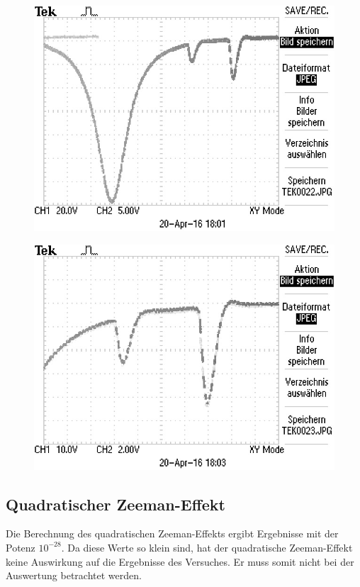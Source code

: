 \begin{figure}[H]
 \centering
 \includegraphics[width=12cm]{TEK0022.jpg}
 \caption{}
 \label{abb:oszi1}
\end{figure}


\begin{figure}[H]
 \centering
 \includegraphics[width=12cm]{TEK0023.jpg}
 \caption{}
 \label{abb:oszi2}
\end{figure}


\subsection{Quadratischer Zeeman-Effekt}

Die Berechnung des quadratischen Zeeman-Effekts ergibt Ergebnisse mit der Potenz $10^{-28}$. Da diese Werte so klein sind, hat der quadratische Zeeman-Effekt keine
Auswirkung auf die Ergebnisse des Versuches. Er muss somit nicht bei der Auswertung betrachtet werden.

